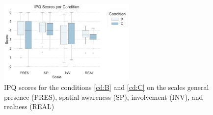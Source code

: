 \begin{figure}[htb]
   \centering
   \includegraphics[width=0.6\textwidth]{include/images/ipq_per_condition}
   \captionsetup{subrefformat=parens}
   \caption[Results: IPQ scores]{\gls{IPQ} scores for the conditions \ref{cd:B} and \ref{cd:C} on the scales general presence (PRES), spatial awareness (SP), involvement (INV), and realness (REAL)}
   \label{fig:presence}
\end{figure}